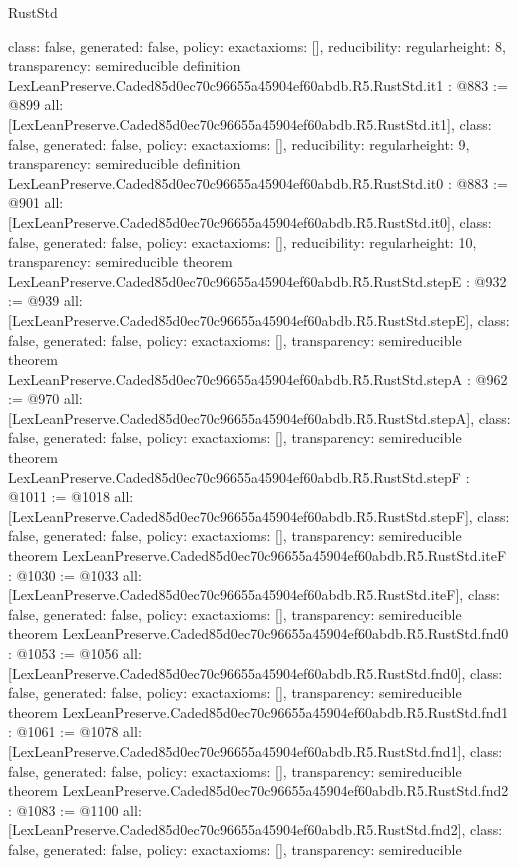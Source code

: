 \begin{lexlean}{RustStd}
\begin{coremodule}
{  class: false,
  generated: false,
  policy: exact{axioms: []},
  reducibility: regular{height: 8},
  transparency: semireducible
}
definition LexLeanPreserve.Caded85d0ec70c96655a45904ef60abdb.R5.RustStd.it1 : @883 := @899 {
  all: [LexLeanPreserve.Caded85d0ec70c96655a45904ef60abdb.R5.RustStd.it1],
  class: false,
  generated: false,
  policy: exact{axioms: []},
  reducibility: regular{height: 9},
  transparency: semireducible
}
definition LexLeanPreserve.Caded85d0ec70c96655a45904ef60abdb.R5.RustStd.it0 : @883 := @901 {
  all: [LexLeanPreserve.Caded85d0ec70c96655a45904ef60abdb.R5.RustStd.it0],
  class: false,
  generated: false,
  policy: exact{axioms: []},
  reducibility: regular{height: 10},
  transparency: semireducible
}
theorem LexLeanPreserve.Caded85d0ec70c96655a45904ef60abdb.R5.RustStd.stepE : @932 := @939 {
  all: [LexLeanPreserve.Caded85d0ec70c96655a45904ef60abdb.R5.RustStd.stepE],
  class: false,
  generated: false,
  policy: exact{axioms: []},
  transparency: semireducible
}
theorem LexLeanPreserve.Caded85d0ec70c96655a45904ef60abdb.R5.RustStd.stepA : @962 := @970 {
  all: [LexLeanPreserve.Caded85d0ec70c96655a45904ef60abdb.R5.RustStd.stepA],
  class: false,
  generated: false,
  policy: exact{axioms: []},
  transparency: semireducible
}
theorem LexLeanPreserve.Caded85d0ec70c96655a45904ef60abdb.R5.RustStd.stepF : @1011 := @1018 {
  all: [LexLeanPreserve.Caded85d0ec70c96655a45904ef60abdb.R5.RustStd.stepF],
  class: false,
  generated: false,
  policy: exact{axioms: []},
  transparency: semireducible
}
theorem LexLeanPreserve.Caded85d0ec70c96655a45904ef60abdb.R5.RustStd.iteF : @1030 := @1033 {
  all: [LexLeanPreserve.Caded85d0ec70c96655a45904ef60abdb.R5.RustStd.iteF],
  class: false,
  generated: false,
  policy: exact{axioms: []},
  transparency: semireducible
}
theorem LexLeanPreserve.Caded85d0ec70c96655a45904ef60abdb.R5.RustStd.fnd0 : @1053 := @1056 {
  all: [LexLeanPreserve.Caded85d0ec70c96655a45904ef60abdb.R5.RustStd.fnd0],
  class: false,
  generated: false,
  policy: exact{axioms: []},
  transparency: semireducible
}
theorem LexLeanPreserve.Caded85d0ec70c96655a45904ef60abdb.R5.RustStd.fnd1 : @1061 := @1078 {
  all: [LexLeanPreserve.Caded85d0ec70c96655a45904ef60abdb.R5.RustStd.fnd1],
  class: false,
  generated: false,
  policy: exact{axioms: []},
  transparency: semireducible
}
theorem LexLeanPreserve.Caded85d0ec70c96655a45904ef60abdb.R5.RustStd.fnd2 : @1083 := @1100 {
  all: [LexLeanPreserve.Caded85d0ec70c96655a45904ef60abdb.R5.RustStd.fnd2],
  class: false,
  generated: false,
  policy: exact{axioms: []},
  transparency: semireducible
}

\end{coremodule}
\end{lexlean}
